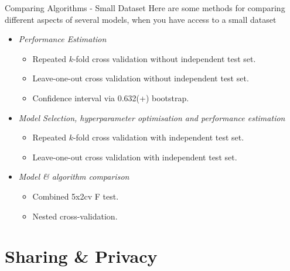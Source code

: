 \documentclass[11pt,a4paper]{article}
\begin{document}
  \begin{proposition}{Comparing Algorithms - Small Dataset}
    Here are some methods for comparing different aspects of several models, when you have access to a small dataset
    \begin{itemize}
      \item \textit{Performance Estimation}
      \begin{itemize}
        \item Repeated $k$-fold cross validation without independent test set.
        \item Leave-one-out cross validation without independent test set.
        \item Confidence interval via 0.632(+) bootstrap.
      \end{itemize}
      \item \textit{Model Selection, hyperparameter optimisation and performance estimation}
      \begin{itemize}
        \item Repeated $k$-fold cross validation with independent test set.
        \item Leave-one-out cross validation with independent test set.
      \end{itemize}
      \item \textit{Model \& algorithm comparison}
      \begin{itemize}
        \item Combined 5x2cv F test.
        \item Nested cross-validation.
      \end{itemize}
    \end{itemize}
  \end{proposition}

\section{Sharing \& Privacy}\label{sec_sharing_and_privacy}
\end{document}
